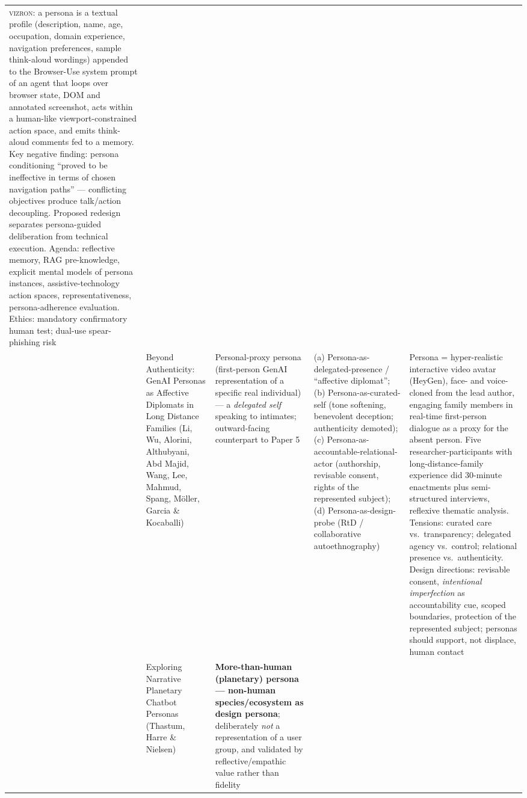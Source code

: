 \begin{table}[t]
\begin{tabular}{p{0.5cm} p{3.6cm} p{3.4cm} p{3.6cm} p{3.6cm}}
\textsc{vizron}: a persona is a textual profile (description, name, age, occupation, domain experience, navigation preferences, sample think-aloud wordings) appended to the Browser-Use system prompt of an agent that loops over browser state, DOM and annotated screenshot, acts within a human-like viewport-constrained action space, and emits think-aloud comments fed to a memory. Key negative finding: persona conditioning ``proved to be ineffective in terms of chosen navigation paths'' --- conflicting objectives produce talk/action decoupling. Proposed redesign separates persona-guided deliberation from technical execution. Agenda: reflective memory, RAG pre-knowledge, explicit mental models of persona instances, assistive-technology action spaces, representativeness, persona-adherence evaluation. Ethics: mandatory confirmatory human test; dual-use spear-phishing risk \\
\addlinespace
14 & Beyond Authenticity: GenAI Personas as Affective Diplomats in Long Distance Families (Li, Wu, Alorini, Althubyani, Abd Majid, Wang, Lee, Mahmud, Spang, Möller, Garcia \& Kocaballi) &
Personal-proxy persona (first-person GenAI representation of a specific real individual) --- a \emph{delegated self} speaking to intimates; outward-facing counterpart to Paper 5 &
(a) Persona-as-delegated-presence / ``affective diplomat''; (b) Persona-as-curated-self (tone softening, benevolent deception; authenticity demoted); (c) Persona-as-accountable-relational-actor (authorship, revisable consent, rights of the represented subject); (d) Persona-as-design-probe (RtD / collaborative autoethnography) &
Persona = hyper-realistic interactive video avatar (HeyGen), face- and voice-cloned from the lead author, engaging family members in real-time first-person dialogue as a proxy for the absent person. Five researcher-participants with long-distance-family experience did 30-minute enactments plus semi-structured interviews, reflexive thematic analysis. Tensions: curated care vs.\ transparency; delegated agency vs.\ control; relational presence vs.\ authenticity. Design directions: revisable consent, \emph{intentional imperfection} as accountability cue, scoped boundaries, protection of the represented subject; personas should support, not displace, human contact \\
\addlinespace
15 & Exploring Narrative Planetary Chatbot Personas (Thastum, Harre \& Nielsen) &
\textbf{More-than-human (planetary) persona --- non-human species/ecosystem as design persona}; deliberately \emph{not} a representation of a user group, and validated by reflective/empathic value rather than fidelity &

\end{tabular}
\end{table}

